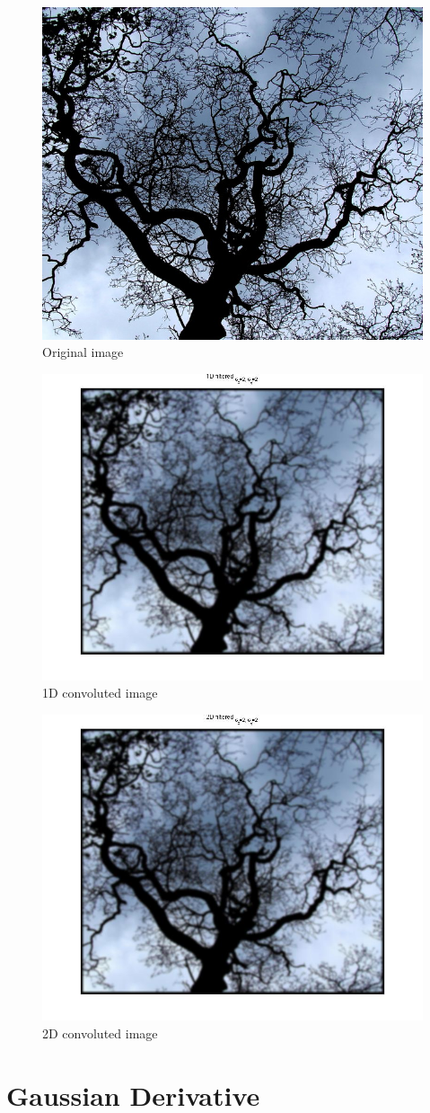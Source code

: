\documentclass[11pt]{article}
\begin{document}
\begin{figure}[H]
	\centering
	\includegraphics[width=.8\textwidth]{imgs/branches.jpg}
	\caption{Original image}
	\label{fig:original}
\end{figure}

\begin{figure}[H]
	\centering
	\includegraphics[width=.8\textwidth]{imgs/1D_branches.jpg}
	\caption{1D convoluted image}
	\label{fig:1D}
\end{figure}

\begin{figure}[H]
	\centering
	\includegraphics[width=.8\textwidth]{imgs/2D_branches.jpg}
	\caption{2D convoluted image}
	\label{fig:2D}
\end{figure}

\section{Gaussian Derivative}
\end{document}
